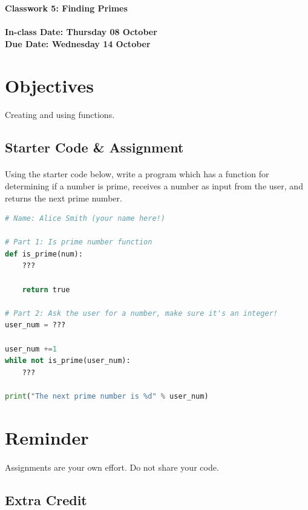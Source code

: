 \documentclass[letter,10pt]{article}
\begin{document}
    \huge
    \textbf{Classwork 5: Finding Primes}
    \normalsize
    \\ ~~ \\
    \textbf{In-class Date: Thursday 08 October} \\
    \textbf{Due Date: Wednesday 14 October}
    
    \section*{Objectives}
    \paragraph{}Creating and using functions.
    
    \subsection*{Starter Code \& Assignment}
    \paragraph{}Using the starter code below, write a program which has a function for determining if a number is prime, receives a number as input from the user, and returns the next prime number.
    
    \begin{lstlisting}[language=python]
# Name: Alice Smith (your name here!)

# Part 1: Is prime number function
def is_prime(num):
    ???
    
    return true

# Part 2: Ask the user for a number, make sure it's an integer!
user_num = ???

user_num +=1
while not is_prime(user_num):
    ???

print("The next prime number is %d" % user_num)
    \end{lstlisting}
    
    \section*{Reminder}
    \paragraph{}Assignments are your own effort. Do not share your code.
    
    \subsection*{Extra Credit}
\end{document}
